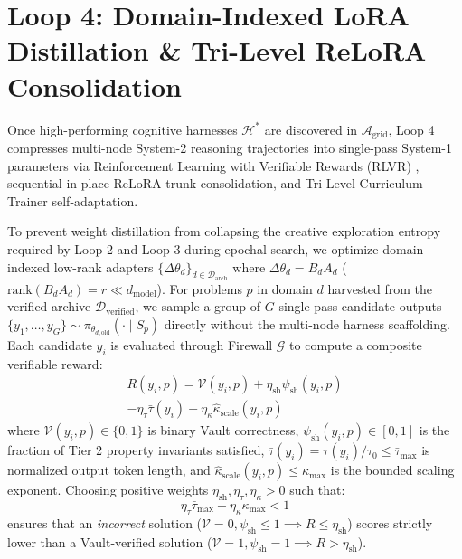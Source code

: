 \documentclass[10pt,twocolumn,letterpaper]{article}
\begin{document}
\section{Loop 4: Domain-Indexed LoRA Distillation \& Tri-Level ReLoRA Consolidation}
Once high-performing cognitive harnesses $\mathcal{H}^{*}$ are discovered in $\mathcal{A}_{\text{grid}}$, Loop 4 compresses multi-node System-2 reasoning trajectories into single-pass System-1 parameters via Reinforcement Learning with Verifiable Rewards (RLVR) \cite{shao2024,deepseek2025}, sequential in-place ReLoRA trunk consolidation, and Tri-Level Curriculum-Trainer self-adaptation.

To prevent weight distillation from collapsing the creative exploration entropy required by Loop 2 and Loop 3 during epochal search, we optimize domain-indexed low-rank adapters $\{\Delta\theta_{d}\}_{d\in\mathcal{D}_{\text{arch}}}$ where $\Delta\theta_{d}=B_{d}A_{d}$ ($\text{rank}(B_{d}A_{d})=r\ll d_{\text{model}}$). For problems $p$ in domain $d$ harvested from the verified archive $\mathcal{D}_{\text{verified}}$, we sample a group of $G$ single-pass candidate outputs $\{y_{1},\dots,y_{G}\}\sim\pi_{\theta_{d,\text{old}}}(\cdot\mid S_{p})$ directly without the multi-node harness scaffolding. Each candidate $y_{i}$ is evaluated through Firewall $\mathcal{G}$ to compute a composite verifiable reward:
\begin{multline}
R(y_{i},p) = \mathcal{V}(y_{i},p) + \eta_{\text{sh}}\psi_{\text{sh}}(y_{i},p) \\
- \eta_{\tau}\bar{\tau}(y_{i}) - \eta_{\kappa}\hat{\kappa}_{\text{scale}}(y_{i},p)
\end{multline}
where $\mathcal{V}(y_{i},p)\in\{0,1\}$ is binary Vault correctness, $\psi_{\text{sh}}(y_{i},p)\in[0,1]$ is the fraction of Tier 2 property invariants satisfied, $\bar{\tau}(y_{i})=\tau(y_{i})/\tau_{0}\le\bar{\tau}_{\max}$ is normalized output token length, and $\hat{\kappa}_{\text{scale}}(y_{i},p)\le\kappa_{\max}$ is the bounded scaling exponent. Choosing positive weights $\eta_{\text{sh}},\eta_{\tau},\eta_{\kappa}>0$ such that:
\begin{equation}
\eta_{\tau}\bar{\tau}_{\max} + \eta_{\kappa}\kappa_{\max} < 1
\end{equation}
ensures that an \textit{incorrect} solution ($\mathcal{V}=0,\psi_{\text{sh}}\le 1\implies R\le\eta_{\text{sh}}$) scores strictly lower than a Vault-verified solution ($\mathcal{V}=1,\psi_{\text{sh}}=1\implies R>\eta_{\text{sh}}$).
\end{document}
